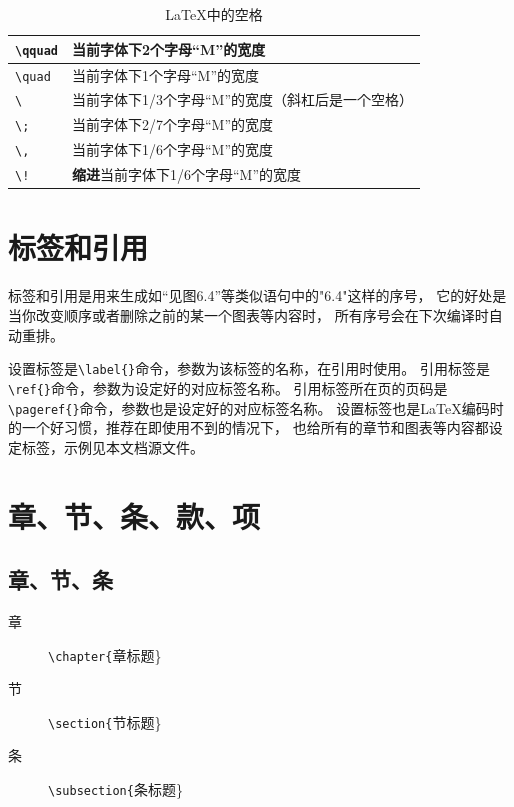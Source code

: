 \begin{table}
	\centering
	\caption{\LaTeX{}中的空格}
	\label{tab-space}
	\begin{tabular}{l|l}
		\hline
		\verb|\qquad| & 当前字体下2个字母“M”的宽度 \\ \hline
		\verb|\quad|  & 当前字体下1个字母“M”的宽度 \\ \hline
		\verb|\ |     & 当前字体下1/3个字母“M”的宽度（斜杠后是一个空格） \\ \hline
		\verb|\;|     & 当前字体下2/7个字母“M”的宽度 \\ \hline
		\verb|\,|     & 当前字体下1/6个字母“M”的宽度 \\ \hline
		\verb|\!|     & {\bf 缩进}当前字体下1/6个字母“M”的宽度 \\ \hline
	\end{tabular}
\end{table}

\section{标签和引用}
\label{sec-label-ref}

标签和引用是用来生成如“见图6.4”等类似语句中的"6.4"这样的序号，
它的好处是当你改变顺序或者删除之前的某一个图表等内容时，
所有序号会在下次编译时自动重排。

设置标签是\verb|\label{}|命令，参数为该标签的名称，在引用时使用。
引用标签是\verb|\ref{}|命令，参数为设定好的对应标签名称。
引用标签所在页的页码是\verb|\pageref{}|命令，参数也是设定好的对应标签名称。
设置标签也是\LaTeX{}编码时的一个好习惯，推荐在即使用不到的情况下，
也给所有的章节和图表等内容都设定标签，示例见本文档源文件。

\section{章、节、条、款、项}
\label{sec-title}

\subsection{章、节、条}
\label{subsec-chap-etc}

\begin{description}
	\item[章] \verb|\chapter{|章标题\}
		\item[节] \verb|\section{|节标题\}
			\item[条] \verb|\subsection{|条标题\}
			\end{description}
			
